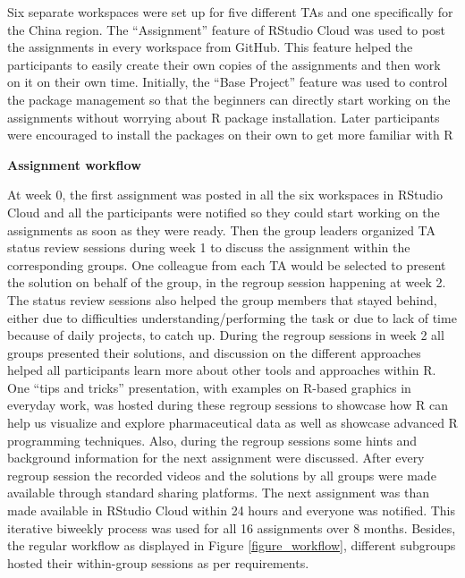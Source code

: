 Six separate workspaces were set up for five different TAs and one
specifically for the China region. The ``Assignment'' feature of RStudio
Cloud was used to post the assignments in every workspace from GitHub.
This feature helped the participants to easily create their own copies
of the assignments and then work on it on their own time. Initially, the
``Base Project'' feature was used to control the package management so
that the beginners can directly start working on the assignments without
worrying about R package installation. Later participants were
encouraged to install the packages on their own to get more familiar
with R

\noindent \textbf{Assignment workflow}

At week 0, the first assignment was posted in all the six workspaces in
RStudio Cloud and all the participants were notified so they could start
working on the assignments as soon as they were ready. Then the group
leaders organized TA status review sessions during week 1 to discuss the
assignment within the corresponding groups. One colleague from each TA
would be selected to present the solution on behalf of the group, in the
regroup session happening at week 2. The status review sessions also
helped the group members that stayed behind, either due to difficulties
understanding/performing the task or due to lack of time because of
daily projects, to catch up. During the regroup sessions in week 2 all
groups presented their solutions, and discussion on the different
approaches helped all participants learn more about other tools and
approaches within R. One ``tips and tricks'' presentation, with examples
on R-based graphics in everyday work, was hosted during these regroup
sessions to showcase how R can help us visualize and explore
pharmaceutical data as well as showcase advanced R programming
techniques. Also, during the regroup sessions some hints and background
information for the next assignment were discussed. After every regroup
session the recorded videos and the solutions by all groups were made
available through standard sharing platforms. The next assignment was
than made available in RStudio Cloud within 24 hours and everyone was
notified. This iterative biweekly process was used for all 16
assignments over 8 months. Besides, the regular workflow as displayed in
Figure \ref{figure_workflow}, different subgroups hosted their
within-group sessions as per requirements.


